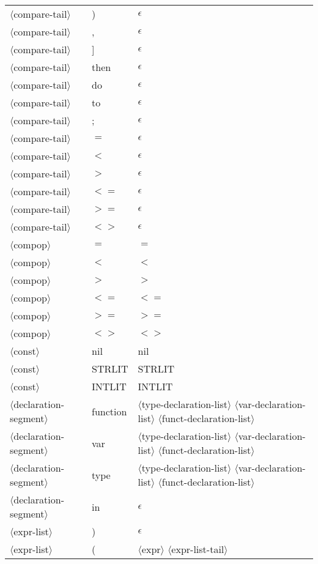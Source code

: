 \documentclass[11pt, fleqn]{article}
\newcommand{\atag}[1]{$\langle$#1$\rangle$}
\begin{document}
\begin{longtable}{l|l|l}
\atag{compare-tail}				&	)			&	$\epsilon$					\\
\atag{compare-tail}				&	,			&	$\epsilon$					\\
\atag{compare-tail}				&	]			&	$\epsilon$					\\
\atag{compare-tail}				&	then			&	$\epsilon$					\\
\atag{compare-tail}				&	do			&	$\epsilon$					\\
\atag{compare-tail}				&	to			&	$\epsilon$					\\
\atag{compare-tail}				&	;			&	$\epsilon$					\\
\atag{compare-tail}				&	$=$			&	$\epsilon$					\\
\atag{compare-tail}				&	$<$			&	$\epsilon$					\\
\atag{compare-tail}				&	$>$			&	$\epsilon$					\\
\atag{compare-tail}				&	$<=$			&	$\epsilon$					\\
\atag{compare-tail}				&	$>=$			&	$\epsilon$					\\
\atag{compare-tail}				&	$<>$			&	$\epsilon$						\\
\atag{compop}					&	$=$			&	$=$								\\
\atag{compop}					&	$<$			&	$<$								\\
\atag{compop}					&	$>$			&	$>$								\\
\atag{compop}					&	$<=$			&	$<=$								\\
\atag{compop}					&	$>=$			&	$>=$								\\
\atag{compop}					&	$<>$			&	$<>$								\\
\atag{const}						&	nil			&	nil	\\
\atag{const}						&	STRLIT		&	STRLIT	\\
\atag{const}						&	INTLIT		&	INTLIT	\\
\atag{declaration-segment}		&	function		&	\atag{type-declaration-list}	\atag{var-declaration-list} \atag{funct-declaration-list}	\\
\atag{declaration-segment}		&	var			&	\atag{type-declaration-list}	\atag{var-declaration-list} \atag{funct-declaration-list}	\\
\atag{declaration-segment}		&	type			&	\atag{type-declaration-list}	\atag{var-declaration-list} \atag{funct-declaration-list}	\\
\atag{declaration-segment}		&	in			&	$\epsilon$	\\
\atag{expr-list}					&	)			&	$\epsilon$				\\
\atag{expr-list}					&	(			&	\atag{expr} \atag{expr-list-tail}				\\

\end{longtable}
\end{document}
